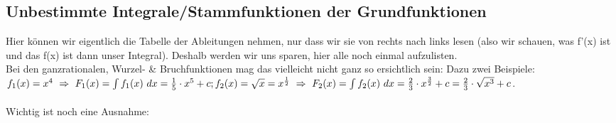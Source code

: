 \subsection{Unbestimmte Integrale/Stammfunktionen der Grundfunktionen}
	Hier können wir eigentlich die Tabelle der Ableitungen nehmen, nur dass wir sie
	von rechts nach links lesen (also wir schauen, was f'(x) ist und das f(x) ist
	dann unser Integral). Deshalb werden wir uns sparen, hier alle noch einmal
	aufzulisten.\\
	Bei den ganzrationalen, Wurzel- \& Bruchfunktionen mag das vielleicht nicht
	ganz so ersichtlich sein:
	\formel{\[f(x)=x^n\ \Rightarrow\ F(x)=\int f(x)\ dx=\frac{1}{n+1}\cdot
	     x^{n+1}+c\]}
	 Dazu zwei Beispiele:\(f_1(x)=x^4\ \Rightarrow\ F_1(x)=\int f_1(x)\
	 dx=\frac{1}{5}\cdot x^5+c;\\
	 f_2(x)=\sqrt{x}=x^\frac{1}{2}\ \Rightarrow\ F_2(x)=\int f_2(x)\
	 dx=\frac{2}{3}\cdot x^{\frac{3}{2}}+c=\frac{2}{3}\cdot \sqrt{x^3}+c\).\\ \\
	Wichtig ist noch eine Ausnahme:
	\formel{\[f(x)=\frac{1}{x}\ \Rightarrow\ \int f(x)\ dx=ln(x)+c\]}
